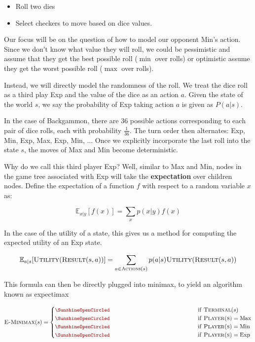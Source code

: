\documentclass[11pt]{article}
\begin{document}
\begin{itemize}
\item Roll two dies
\item Select checkers to move based on dice values. 
\end{itemize}

Our focus will be on the question of how to model our opponent Min's action. Since we don't know what value they will roll, we could be pessimistic and assume that they get the best possible roll ($\min$ over rolls) or optimistic assume they get the worst possible roll ($\max$ over rolls). 


Instead, we will directly model the randomness of the roll. We treat the dice roll as a third play Exp and the value of the dice as an action $a$. Given the state of the world $s$, we say the probability of Exp taking action $a$ is given as $P(a | s)$. 

In the case of Backgammon, there are $36$ possible actions corresponding to each pair of dice rolls, each with probability $\frac{1}{36}$. The turn order then alternates: Exp, Min, Exp, Max, Exp, Min, ...
Once we explicitly incorporate the last roll into the state $s$, the moves of Max and Min become deterministic.  


Why do we call this third player Exp? Well, similar to Max and Min, nodes in the game tree associated with Exp will take the \textbf{expectation} over children nodes. Define the expectation of a function $f$ with respect to a random variable $x$ as:

\[\mathbb{E}_{x|y}[f(x)] = \sum_{x} p(x|y)f(x) \]

In the case of the utility of a state, this gives us a method for computing the expected utility of an Exp state.




\[ \mathbb{E}_{a|s}[\mathrm{\textsc{Utility}}(\mathrm{\textsc{Result}}(s, a))]= \sum_{a \in \mathrm{\textsc{Actions}}(s) } p(a | s) \mathrm{\textsc{Utility}}(\mathrm{\textsc{Result}}(s, a))  \]  

This formula can then be directly plugged into minimax, to yield an algorithm known as expectimax

\[ \msc{E-Minimax}(s) = \begin{cases} 
  \censorm{\msc{Utility}(s)} & \mathrm{if\ } \msc{Terminal}(s)  \\
  \censorm{\max_{a \in \msc{Actions}(s) } \msc{E-Minimax}(\msc{Result}(s, a))} & \mathrm{if\ } \msc{Player(s)} = \mathrm{Max}  \\
  \censorm{\min_{a \in \msc{Actions}(s) } \msc{E-Minimax}(\msc{Result}(s, a))} & \mathrm{if\ } \msc{Player(s)} = \mathrm{Min} \\ 
  \censorm{\sum_{a \in \msc{Actions}(s) } p(a | s) \msc{E-Minimax}(\msc{Result}(s, a))} & \mathrm{if\ } \msc{Player(s)} = \mathrm{Exp} \end{cases}\] 
\end{document}
